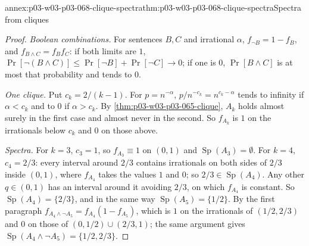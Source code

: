 \begin{annexitem}{annex:p03-w03-p03-068-clique-spectra}{thm:p03-w03-p03-068-clique-spectra}{Spectra from cliques}
\begin{proof}
\emph{Boolean combinations.}  For sentences \(B,C\) and irrational \(\alpha\),
\(f_{\neg B}=1-f_B\), and \(f_{B\wedge C}=f_Bf_C\): if both limits are \(1\),
\(\Pr[\neg(B\wedge C)]\leq\Pr[\neg B]+\Pr[\neg C]\to0\); if one is \(0\),
\(\Pr[B\wedge C]\) is at most that probability and tends to \(0\).

\emph{One clique.}  Put \(c_k=2/(k-1)\).  For \(p=n^{-\alpha}\),
\(p/n^{-c_k}=n^{c_k-\alpha}\) tends to infinity if \(\alpha<c_k\) and to \(0\)
if \(\alpha>c_k\).  By \cref{thm:p03-w03-p03-065-clique}, \(A_k\) holds almost
surely in the first case and almost never in the second.  So \(f_{A_k}\) is
\(1\) on the irrationals below \(c_k\) and \(0\) on those above.

\emph{Spectra.}  For \(k=3\), \(c_3=1\), so \(f_{A_3}\equiv1\) on \((0,1)\)
and \(\operatorname{Sp}(A_3)=\emptyset\).  For \(k=4\), \(c_4=2/3\): every interval around
\(2/3\) contains irrationals on both sides of \(2/3\) inside \((0,1)\), where
\(f_{A_4}\) takes the values \(1\) and \(0\); so \(2/3\in \operatorname{Sp}(A_4)\).  Any other
\(q\in(0,1)\) has an interval around it avoiding \(2/3\), on which
\(f_{A_4}\) is constant.  So \(\operatorname{Sp}(A_4)=\{2/3\}\), and in the same way
\(\operatorname{Sp}(A_5)=\{1/2\}\).  By the first paragraph
\(f_{A_4\wedge\neg A_5}=f_{A_4}(1-f_{A_5})\), which is \(1\) on the irrationals
of \((1/2,2/3)\) and \(0\) on those of \((0,1/2)\cup(2/3,1)\); the same
argument gives \(\operatorname{Sp}(A_4\wedge\neg A_5)=\{1/2,2/3\}\).
\end{proof}
\end{annexitem}


